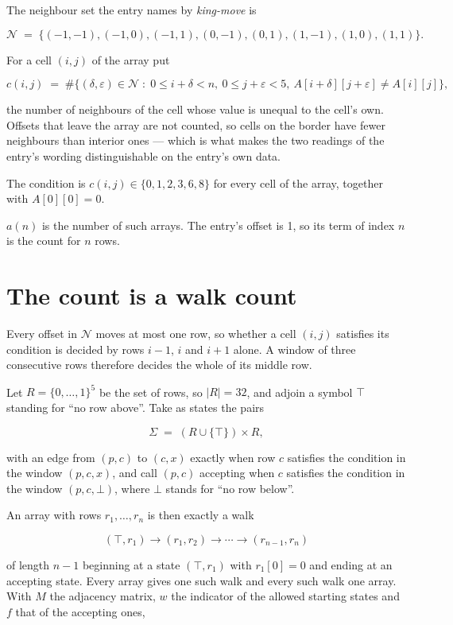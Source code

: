 \documentclass[11pt]{article}
\theoremstyle{definition}
\begin{document}
The neighbour set the entry names by {\itshape king-move} is

\[\mathcal{N} \;=\; \{(-1,-1), (-1,0), (-1,1), (0,-1), (0,1), (1,-1), (1,0), (1,1)\}.\]

For a cell $(i,j)$ of the array put

\[c(i,j) \;=\; \#\bigl\{(\delta,\varepsilon)\in\mathcal{N} \;:\; 0\le i+\delta<n,\ 0\le j+\varepsilon<5,\ A[i+\delta][j+\varepsilon] \neq A[i][j]\bigr\},\]

the number of neighbours of the cell whose value is unequal to the cell's own. Offsets that leave the array are not counted, so cells on the border have fewer neighbours than interior ones --- which is what makes the two readings of the entry's wording distinguishable on the entry's own data.

The condition is $c(i,j) \in \{0, 1, 2, 3, 6, 8\}$ for every cell of the array, together with $A[0][0]=0$.

$a(n)$ is the number of such arrays. The entry's offset is 1, so its term of index $n$ is the count for $n$ rows.

\section{The count is a walk count}

Every offset in $\mathcal{N}$ moves at most one row, so whether a cell $(i,j)$ satisfies its condition is decided by rows $i-1$, $i$ and $i+1$ alone. A window of three consecutive rows therefore decides the whole of its middle row.

Let $R = \{0,\dots,1\}^{5}$ be the set of rows, so $|R| = 32$, and adjoin a symbol $\top$ standing for ``no row above''. Take as states the pairs

\[\Sigma \;=\; (R \cup \{\top\}) \times R,\]

with an edge from $(p,c)$ to $(c,x)$ exactly when row $c$ satisfies the condition in the window $(p,c,x)$, and call $(p,c)$ accepting when $c$ satisfies the condition in the window $(p,c,\bot)$, where $\bot$ stands for ``no row below''.

An array with rows $r_1,\dots,r_n$ is then exactly a walk

\[(\top,r_1) \to (r_1,r_2) \to \cdots \to (r_{n-1},r_n)\]

of length $n-1$ beginning at a state $(\top,r_1)$ with $r_1[0]=0$ and ending at an accepting state. Every array gives one such walk and every such walk one array. With $M$ the adjacency matrix, $w$ the indicator of the allowed starting states and $f$ that of the accepting ones,
\end{document}
